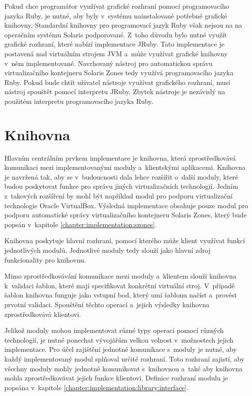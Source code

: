 Pokud chce programátor využívat grafické rozhraní pomocí programovacího jazyka Ruby, je nutné, aby byly v~systému
nainstalované potřebné grafické knihovny. Standardní knihovny pro programovací jazyk Ruby však nejsou na na operačním
systému Solaris podporované. Z~toho důvodu bylo nutné využít grafické rozhraní, které nabízí implementace JRuby.
Tato implementace je postavená nad virtuálním strojem JVM a~může využívat grafické knihovny v~něm implementované.
Navrhovaný nástroj pro automatickou správu virtualizačního kontejneru Solaris Zones tedy využívá programovacího
jazyka Ruby. Pokud bude chtít uživatel nástroje využívat grafického rozhraní, musí nástroj spouštět pomocí
interpretu JRuby. Zbytek nástroje je nezávislý na použitém interpretu programovacího jazyka Ruby.
\section{Knihovna}
\label{chapter:implementation:library}
Hlavním centrálním prvkem implementace je knihovna, která zprostředkovává komunikaci mezi implementovanými moduly
a~klientskými aplikacemi. Knihovna je navržená tak, aby se v~budoucnosti dala lehce rozšířit o~další moduly, které budou
poskytovat funkce pro správu jiných virtualizačních technologií. Jedním z~takových rozšíření by mohl být například modul
pro podporu virtualizační technologie Oracle VirtualBox. Výsledná implementace obsahuje pouze modul pro podporu automatické
správy virtualizačního kontejneru Solaris Zones, který bude popsán v~kapitole \ref{chapter:implementation:szones}.

Knihovna poskytuje hlavní rozhraní, pomocí kterého může klient využívat funkcí jednotlivých modulů. Jednotlivé
moduly tedy slouží jako hlavní zdroj funkcionality pro knihovnu.

Mimo zprostředkovávání komunikace mezi moduly a~klientem slouží knihovna k~validaci šablon, které mají specifikovat
konkrétní virtuální stroj. V~případě šablon knihovna funguje jako vstupní bod, který umí šablonu načíst a~provést
prvotní validaci. Spouštění těchto operací a~jejich výsledky knihovna zprostředkovává klientovi.

Jelikož moduly mohou implementovat různé typy operací pomocí různých technologií, je nutné ponechat vývojářům velkou volnost
v~možnostech jejich implementace. Pro účel zajištění jednotné komunikace s~moduly je nutné, aby každý implementovaný modul
splňoval určité rozhraní. Toto rozhraní zajistí, aby všechny moduly mohly jednotně komunikovat s~knihovnou a~také aby knihovna
mohla zprostředkovávat jejich funkce klientovi. Definice rozhraní modulu je popsána v~kapitole \ref{chapter:implementation:library:interface}.

